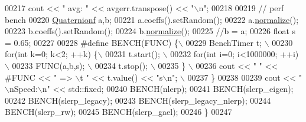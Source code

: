\begin{DoxyCode}
00217   cout << \textcolor{stringliteral}{"  avg: "} << avgerr.transpose() << \textcolor{stringliteral}{"\(\backslash\)n"};
00218   
00219   \textcolor{comment}{// perf bench}
00220   \hyperlink{group___geometry___module_class_eigen_1_1_quaternion}{Quaternionf} a,b;
00221   a.coeffs().setRandom();
00222   a.\hyperlink{group___geometry___module_aa8d67d855940925f634327827aed1cad}{normalize}();
00223   b.coeffs().setRandom();
00224   b.\hyperlink{group___geometry___module_aa8d67d855940925f634327827aed1cad}{normalize}();
00225   \textcolor{comment}{//b = a;}
00226   \textcolor{keywordtype}{float} s = 0.65;
00227     
00228 \textcolor{preprocessor}{  #define BENCH(FUNC) \{\(\backslash\)}
00229 \textcolor{preprocessor}{    BenchTimer t; \(\backslash\)}
00230 \textcolor{preprocessor}{    for(int k=0; k<2; ++k) \{\(\backslash\)}
00231 \textcolor{preprocessor}{      t.start(); \(\backslash\)}
00232 \textcolor{preprocessor}{      for(int i=0; i<1000000; ++i) \(\backslash\)}
00233 \textcolor{preprocessor}{        FUNC(a,b,s); \(\backslash\)}
00234 \textcolor{preprocessor}{      t.stop(); \(\backslash\)}
00235 \textcolor{preprocessor}{    \} \(\backslash\)}
00236 \textcolor{preprocessor}{    cout << "  " << #FUNC << " => \(\backslash\)t " << t.value() << "s\(\backslash\)n"; \(\backslash\)}
00237 \textcolor{preprocessor}{  \}}
00238   
00239   cout << \textcolor{stringliteral}{"\(\backslash\)nSpeed:\(\backslash\)n"} << std::fixed;
00240   BENCH(nlerp);
00241   BENCH(slerp\_eigen);
00242   BENCH(slerp\_legacy);
00243   BENCH(slerp\_legacy\_nlerp);
00244   BENCH(slerp\_rw);
00245   BENCH(slerp\_gael);
00246 \}
00247 
\end{DoxyCode}
